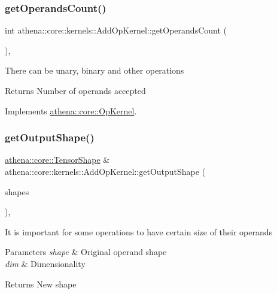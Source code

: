 \subsubsection{\texorpdfstring{get\+Operands\+Count()}{getOperandsCount()}}
{\footnotesize\ttfamily int athena\+::core\+::kernels\+::\+Add\+Op\+Kernel\+::get\+Operands\+Count (\begin{DoxyParamCaption}{ }\end{DoxyParamCaption})\hspace{0.3cm}{\ttfamily [override]}, {\ttfamily [virtual]}}

There can be unary, binary and other operations \begin{DoxyReturn}{Returns}
Number of operands accepted 
\end{DoxyReturn}


Implements \mbox{\hyperlink{classathena_1_1core_1_1_op_kernel_add97d4c132d80ecd9915acfedf7c9119}{athena\+::core\+::\+Op\+Kernel}}.

\mbox{\label{classathena_1_1core_1_1kernels_1_1_add_op_kernel_a687d68d7374e9546f01cefcbfb382d04}} 
\subsubsection{\texorpdfstring{get\+Output\+Shape()}{getOutputShape()}}
{\footnotesize\ttfamily \mbox{\hyperlink{classathena_1_1core_1_1_tensor_shape}{athena\+::core\+::\+Tensor\+Shape}} \& athena\+::core\+::kernels\+::\+Add\+Op\+Kernel\+::get\+Output\+Shape (\begin{DoxyParamCaption}\item[{std\+::vector$<$ \mbox{\hyperlink{classathena_1_1core_1_1_tensor_shape}{athena\+::core\+::\+Tensor\+Shape}} $>$ \&}]{shapes }\end{DoxyParamCaption})\hspace{0.3cm}{\ttfamily [override]}, {\ttfamily [virtual]}}

It is important for some operations to have certain size of their operands 
\begin{DoxyParams}{Parameters}
{\em shape} & Original operand shape \\
\hline
{\em dim} & Dimensionality \\
\hline
\end{DoxyParams}
\begin{DoxyReturn}{Returns}
New shape 
\end{DoxyReturn}



